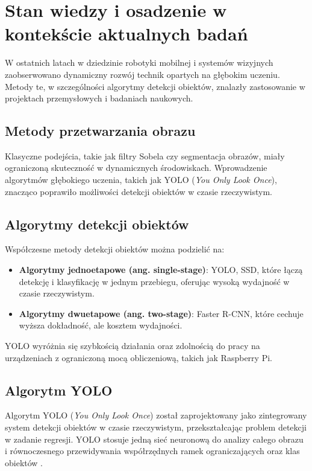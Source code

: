\documentclass[a4paper,twoside,12pt]{book}
\begin{document}
\newpage

\section{Stan wiedzy i osadzenie w kontekście aktualnych badań}
W ostatnich latach w dziedzinie robotyki mobilnej i systemów wizyjnych zaobserwowano dynamiczny rozwój technik opartych na głębokim uczeniu. Metody te, w szczególności algorytmy detekcji obiektów, znalazły zastosowanie w projektach przemysłowych i badaniach naukowych.

\subsection{Metody przetwarzania obrazu}
Klasyczne podejścia, takie jak filtry Sobela czy segmentacja obrazów, miały ograniczoną skuteczność w dynamicznych środowiskach. Wprowadzenie algorytmów głębokiego uczenia, takich jak YOLO (\textit{You Only Look Once}), znacząco poprawiło możliwości detekcji obiektów w czasie rzeczywistym.

\subsection{Algorytmy detekcji obiektów}
Współczesne metody detekcji obiektów można podzielić na:
\begin{itemize}
    \item \textbf{Algorytmy jednoetapowe (ang. single-stage)}: YOLO, SSD, które łączą detekcję i klasyfikację w jednym przebiegu, oferując wysoką wydajność w czasie rzeczywistym.
    \item \textbf{Algorytmy dwuetapowe (ang. two-stage)}: Faster R-CNN, które cechuje wyższa dokładność, ale kosztem wydajności.
\end{itemize}
YOLO wyróżnia się szybkością działania oraz zdolnością do pracy na urządzeniach z ograniczoną mocą obliczeniową, takich jak Raspberry Pi.

\subsection{Algorytm YOLO}
Algorytm YOLO (\textit{You Only Look Once}) został zaprojektowany jako zintegrowany system detekcji obiektów w czasie rzeczywistym, przekształcając problem detekcji w zadanie regresji. YOLO stosuje jedną sieć neuronową do analizy całego obrazu i równoczesnego przewidywania współrzędnych ramek ograniczających oraz klas obiektów \cite{redmon2016yolo}.
\end{document}
